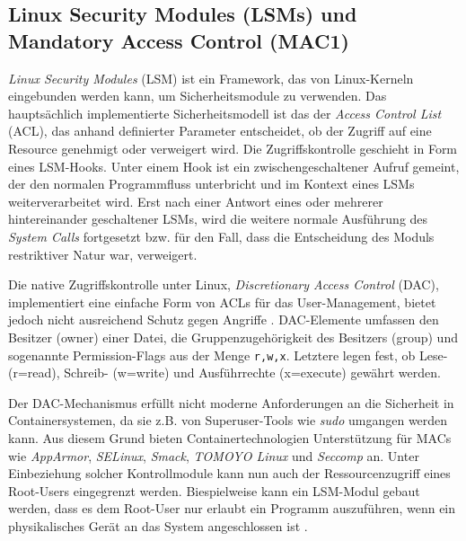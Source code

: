 \documentclass[../main.tex]{subfiles}
\begin{document}

    \subsection{Linux Security Modules (\acrshort{LSM}s) und Mandatory Access Control (\acrshort{MAC1})}

			\emph{Linux Security Modules} (\acrshort{LSM}) ist ein Framework, das von Linux-Kerneln eingebunden werden kann, um Sicherheitsmodule zu verwenden. Das hauptsächlich implementierte Sicherheitsmodell ist das der \emph{Access Control List} (\acrshort{ACL}), das anhand definierter Parameter entscheidet, ob der Zugriff auf eine Resource genehmigt oder verweigert wird. %
			Die Zugriffskontrolle geschieht in Form eines LSM-Hooks. Unter einem Hook ist ein zwischengeschaltener Aufruf gemeint, der den normalen Programmfluss unterbricht und im Kontext eines LSMs weiterverarbeitet wird. Erst nach einer Antwort eines oder mehrerer hintereinander geschaltener LSMs, wird die weitere normale Ausführung des \emph{System Calls} fortgesetzt bzw. für den Fall, dass die Entscheidung des Moduls restriktiver Natur war, verweigert.

			Die native Zugriffskontrolle unter Linux, \emph{Discretionary Access Control} (\acrshort{DAC}), implementiert eine einfache Form von \acrshort{ACL}s für das User-Management, bietet jedoch nicht ausreichend Schutz gegen Angriffe \cite[S.1]{LSMFramework}. DAC-Elemente umfassen den Besitzer (owner) einer Datei, die Gruppenzugehörigkeit des Besitzers (group) und sogenannte Permission-Flags aus der Menge \texttt{r,w,x}. Letztere legen fest, ob Lese- (r=read), Schreib- (w=write) und Ausführrechte (x=execute) gewährt werden.

			Der DAC-Mechanismus erfüllt nicht moderne Anforderungen an die Sicherheit in Containersystemen, da sie z.B. von Superuser-Tools wie \emph{sudo} umgangen werden kann. Aus diesem Grund bieten Containertechnologien Unterstützung für MACs wie \emph{AppArmor}, \emph{SELinux}, \emph{Smack}, \emph{TOMOYO Linux} und \emph{Seccomp} an. Unter Einbeziehung solcher Kontrollmodule kann nun auch der Ressourcenzugriff eines Root-Users eingegrenzt werden. Biespielweise kann ein LSM-Modul gebaut werden, dass es dem Root-User nur erlaubt ein Programm auszuführen, wenn ein physikalisches Gerät an das System angeschlossen ist \cite{LSMUsing}.
\end{document}
